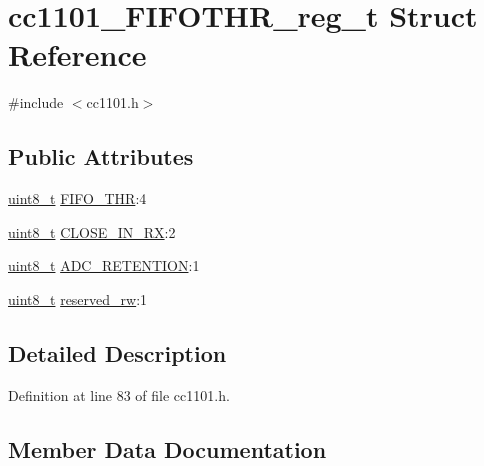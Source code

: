 \hypertarget{structcc1101___f_i_f_o_t_h_r__reg__t}{}\section{cc1101\+\_\+\+F\+I\+F\+O\+T\+H\+R\+\_\+reg\+\_\+t Struct Reference}
\label{structcc1101___f_i_f_o_t_h_r__reg__t}


{\ttfamily \#include $<$cc1101.\+h$>$}

\subsection*{Public Attributes}
\begin{DoxyCompactItemize}
\item 
\hyperlink{_p_e___types_8h_aba7bc1797add20fe3efdf37ced1182c5}{uint8\+\_\+t} \hyperlink{structcc1101___f_i_f_o_t_h_r__reg__t_ac2736149dd3869020df9f5b281c3d2e8}{F\+I\+F\+O\+\_\+\+T\+HR}\+:4
\item 
\hyperlink{_p_e___types_8h_aba7bc1797add20fe3efdf37ced1182c5}{uint8\+\_\+t} \hyperlink{structcc1101___f_i_f_o_t_h_r__reg__t_a04e7c193e07ec532af3d9899dad352db}{C\+L\+O\+S\+E\+\_\+\+I\+N\+\_\+\+RX}\+:2
\item 
\hyperlink{_p_e___types_8h_aba7bc1797add20fe3efdf37ced1182c5}{uint8\+\_\+t} \hyperlink{structcc1101___f_i_f_o_t_h_r__reg__t_aa9fa5993faaf2d645fb404c2dfe5f948}{A\+D\+C\+\_\+\+R\+E\+T\+E\+N\+T\+I\+ON}\+:1
\item 
\hyperlink{_p_e___types_8h_aba7bc1797add20fe3efdf37ced1182c5}{uint8\+\_\+t} \hyperlink{structcc1101___f_i_f_o_t_h_r__reg__t_a83a5faeff51aa0e5bd2eb51fa8d0cacd}{reserved\+\_\+rw}\+:1
\end{DoxyCompactItemize}


\subsection{Detailed Description}


Definition at line 83 of file cc1101.\+h.



\subsection{Member Data Documentation}
